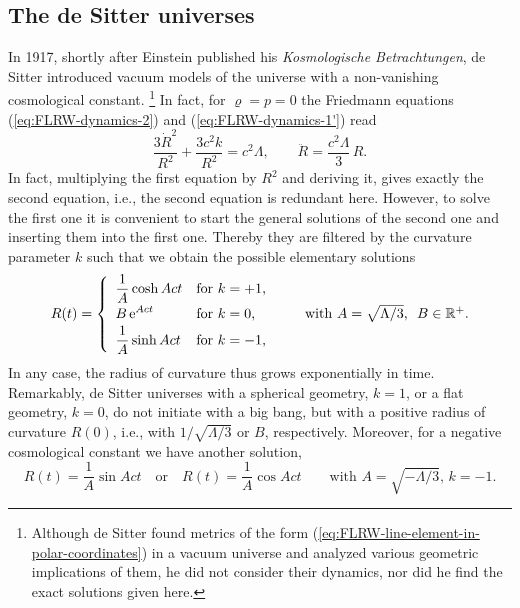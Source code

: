 \subsection{The de Sitter universes}
In 1917, shortly after Einstein published his \emph{Kos\-mo\-lo\-gi\-sche Be\-trach\-tun\-gen}, de Sitter introduced vacuum models of the universe with a non-vanishing cosmological constant.
\cites{de-Sitter-1917a,de-Sitter-1917b,de-Sitter-1917c}\footnote{
	Although de Sitter found metrics of the form (\ref{eq:FLRW-line-element-in-polar-coordinates}) in a vacuum universe and analyzed various geometric implications of them, he did not consider their dynamics, nor did he find the exact solutions given here.
}
In fact, for $\varrho = p = 0$ the Friedmann equations (\ref{eq:FLRW-dynamics-2}) and (\ref{eq:FLRW-dynamics-1'}) read
\begin{equation}
	\frac{3 \dot{R}^2}{R^2} + \frac{3 c^2 k}{R^2}
	= c^2 \Lambda,
	\qquad
	\ddot{R} = \frac{c^2 \Lambda}{3} \, R
	.
\end{equation}
In fact, multiplying the first equation by $R^2$ and deriving it, gives exactly the second equation, i.e., the second equation is redundant here. However, to solve the first one it is convenient to start the general solutions of the second one and inserting them into the first one. Thereby they are filtered by the curvature parameter $k$ such that we obtain the possible elementary solutions \cite[235]{Stephani-1991}
\begin{equation}
	R(t) 
	= \left\{\begin{array}{ll} \displaystyle
		\frac{1}{A} \cosh A c t & \mbox{for $k = +1$,}
		\\ [1.25ex] \displaystyle
		B \,\mathrm{e}^{Act} & \mbox{for $k = 0$,}
		\\ [.5	ex] \displaystyle
		\frac{1}{A} \sinh A c t & \mbox{for $k = -1$,}
	\end{array}\right.
	\qquad
	\mbox{with $A = \sqrt{\Lambda / 3}$, \ $B \in \mathbb{R}^+.$}
	\label{eq:de-Sitter-universes-Lambda>0}
\end{equation}
In any case, the radius of curvature thus grows exponentially in time.
Remarkably, de Sitter universes with a spherical geometry, $k=1$, 
or a flat geometry, $k=0$, do not initiate with a big bang, but with a positive radius of curvature $R(0)$, i.e., with $1/\sqrt{\Lambda/3}$ or $B$, respectively.
Moreover, for a negative cosmological constant we have another solution,
\begin{equation}
	R(t) = \frac{1}{A} \sin Act
	\quad \mbox{or} \quad
	R(t) = \frac{1}{A} \cos Act	
	\qquad
	\mbox{with \ $A = \sqrt{-\Lambda/3}$, \ $k = -1$.}
	\label{eq:de-Sitter-universe-Lambda<0}
\end{equation}
